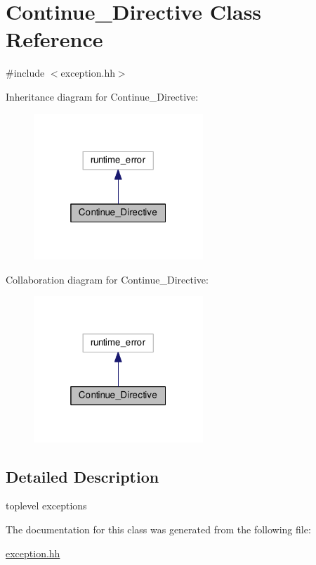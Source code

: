 \hypertarget{classContinue__Directive}{\section{Continue\-\_\-\-Directive Class Reference}
\label{classContinue__Directive}
}


{\ttfamily \#include $<$exception.\-hh$>$}



Inheritance diagram for Continue\-\_\-\-Directive\-:\nopagebreak
\begin{figure}[H]
\begin{center}
\leavevmode
\includegraphics[width=181pt]{classContinue__Directive__inherit__graph}
\end{center}
\end{figure}


Collaboration diagram for Continue\-\_\-\-Directive\-:\nopagebreak
\begin{figure}[H]
\begin{center}
\leavevmode
\includegraphics[width=181pt]{classContinue__Directive__coll__graph}
\end{center}
\end{figure}


\subsection{Detailed Description}
toplevel exceptions 

The documentation for this class was generated from the following file\-:\begin{DoxyCompactItemize}
\item 
\hyperlink{exception_8hh}{exception.\-hh}\end{DoxyCompactItemize}
